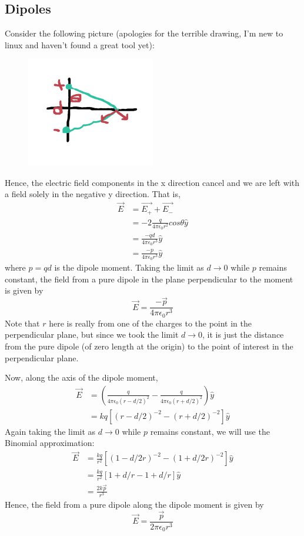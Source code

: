 \documentclass{article}
\begin{document}
\newpage

\subsection{Dipoles}

Consider the following picture (apologies for the terrible drawing, I'm new to linux and haven't found a great tool yet):
\begin{figure}[h]
\includegraphics[width=0.5\textwidth]{dipole.png}
\end{figure}
Hence, the electric field components in the x direction cancel and we are left with a field solely in the negative y direction. That is,
\begin{align*}
\vec{E} &= \vec{E_{+}} + \vec{E_{-}} \\
&= -2\frac{q}{4\pi\epsilon_0 r^2}cos\theta \hat{y} \\
&= \frac{-qd}{4\pi\epsilon_0 r^3}\hat{y} \\
&= \frac{-p}{4\pi\epsilon_0 r^3}\hat{y}
\end{align*}
where $p=qd$ is the dipole moment. Taking the limit as $d\rightarrow 0$ while $p$ remains constant, the field from a pure dipole in the plane perpendicular to the moment is given by
\begin{equation}
\vec{E} = \frac{-\vec{p}}{4\pi\epsilon_0 r^3}
\end{equation}
Note that $r$ here is really from one of the charges to the point in the perpendicular plane, but since we took the limit $d\rightarrow 0$, it is just the distance from the pure dipole (of zero length at the origin) to the point of interest in the perpendicular plane.

Now, along the axis of the dipole moment,
\begin{align*}
\vec{E} &= \left(\frac{q}{4\pi\epsilon_0 (r-d/2)^2}-\frac{q}{4\pi\epsilon_0 (r+d/2)^2}\right)\hat{y} \\
&= kq\left[(r-d/2)^{-2} - (r+d/2)^{-2}\right]\hat{y}
\end{align*}
Again taking the limit as $d\rightarrow 0$ while $p$ remains constant, we will use the Binomial approximation:
\begin{align*}
\vec{E} &= \frac{kq}{r^2}\left[(1-d/2r)^{-2} - (1+d/2r)^{-2}\right]\hat{y} \\
&= \frac{kq}{r^2}\left[1+d/r-1+d/r\right]\hat{y} \\
&= \frac{2k\vec{p}}{r^3}
\end{align*}
Hence, the field from a pure dipole along the dipole moment is given by
\begin{equation}
\vec{E} = \frac{\vec{p}}{2\pi\epsilon_0 r^3}
\end{equation}
\end{document}
